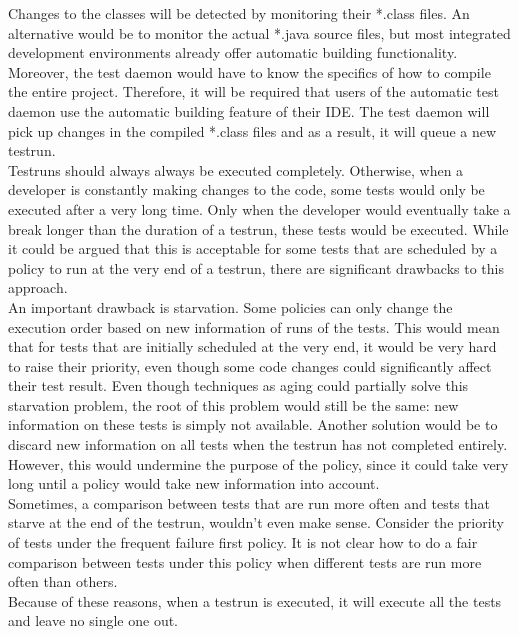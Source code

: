 \documentclass[i2]{oss}
\begin{document}
Changes to the classes will be detected by monitoring their *.class files.
An alternative would be to monitor the actual *.java source files, but most integrated development environments already offer automatic building functionality.
Moreover, the test daemon would have to know the specifics of how to compile the entire project. 
Therefore, it will be required that users of the automatic test daemon use the automatic building feature of their IDE.
The test daemon will pick up changes in the compiled *.class files and as a result, it will queue a new testrun.\\

Testruns should always always be executed completely.
Otherwise, when a developer is constantly making changes to the code, some tests would only be executed after a very long time.
Only when the developer would eventually take a break longer than the duration of a testrun, these tests would be executed.
While it could be argued that this is acceptable for some tests that are scheduled by a policy to run at the very end of a testrun, there are significant drawbacks to this approach.\\

An important drawback is starvation. Some policies can only change the execution order based on new information of runs of the tests.
This would mean that for tests that are initially scheduled at the very end, it would be very hard to raise their priority, even though some code changes could significantly affect their test result.
Even though techniques as aging could partially solve this starvation problem, the root of this problem would still be the same: new information on these tests is simply not available. Another solution would be to discard new information on all tests when the testrun has not completed entirely. However, this would undermine the purpose of the policy, since it could take very long until a policy would take new information into account.\\

Sometimes, a comparison between tests that are run more often and tests that starve at the end of the testrun, wouldn't even make sense.
Consider the priority of tests under the frequent failure first policy.
It is not clear how to do a fair comparison between tests under this policy when different tests are run more often than others.\\

Because of these reasons, when a testrun is executed, it will execute all the tests and leave no single one out.\\
\end{document}
